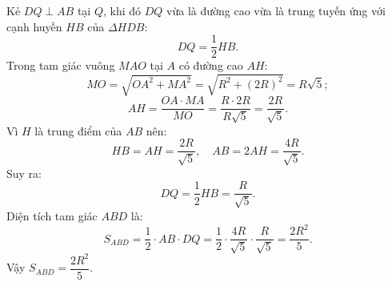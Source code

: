 \begin{bt}
{\begin{enumerate}[a)]
			Kẻ $DQ \perp AB$ tại $Q$, khi đó $DQ$ vừa là đường cao vừa là trung tuyến ứng với cạnh huyền $HB$ của $\Delta HDB$:
			$$DQ = \dfrac{1}{2}HB.$$
			Trong tam giác vuông $MAO$ tại $A$ có đường cao $AH$:
			$$MO = \sqrt{OA^2 + MA^2} = \sqrt{R^2 + (2R)^2} = R\sqrt{5};$$
			$$AH = \dfrac{OA \cdot MA}{MO} = \dfrac{R \cdot 2R}{R\sqrt{5}} = \dfrac{2R}{\sqrt{5}}.$$
			Vì $H$ là trung điểm của $AB$ nên:
			$$HB = AH = \dfrac{2R}{\sqrt{5}},\quad AB = 2AH = \dfrac{4R}{\sqrt{5}}.$$
			Suy ra:
			$$DQ = \dfrac{1}{2}HB = \dfrac{R}{\sqrt{5}}.$$
			Diện tích tam giác $ABD$ là:
			$$S_{ABD} = \dfrac{1}{2} \cdot AB \cdot DQ = \dfrac{1}{2} \cdot \dfrac{4R}{\sqrt{5}} \cdot \dfrac{R}{\sqrt{5}} = \dfrac{2R^2}{5}.$$
			Vậy $S_{ABD} = \dfrac{2R^2}{5}$.
		\end{enumerate}
	}
\end{bt}

